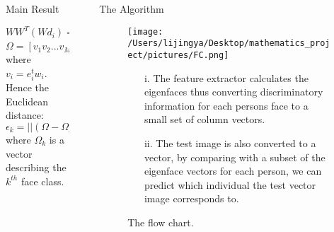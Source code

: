 \documentclass[final]{beamer}
\newlength{\sepwid}
\newlength{\onecolwid}
\newlength{\middlecolwid}
\begin{document}
\begin{frame}[t]
\begin{columns}[t]
\begin{column}{\middlecolwid}
\begin{alertblock}{Main Result}
\end{alertblock}

\vspace{-5mm}

\begin{block}

 
\begin{equation*}
WW^T(Wd_i) =\mu_i(Wd_i)
\end{equation*}
\begin{equation*}
\Omega = [v_1v_2...v_{M'}]^T
\end{equation*}
where $v_i=e_i^tw_i$. Hence the Euclidean distance:\\
\begin{equation*}
\epsilon_k = ||(\Omega - \Omega_k)||
\end{equation*}
where $\Omega_k$ is a vector describing the $k^{th}$ face class.
\end{block}
\end{column} %


\begin{column}{\sepwid}\end{column} %

\begin{column}{\onecolwid} %




\begin{block}{The Algorithm}
\begin{figure}[h]
\centering
\texttt{[image: /Users/lijingya/Desktop/mathematics\_project/pictures/FC.png]}
\caption{ The flow chart.}
\begin{itemize}
\item[i.] The feature extractor calculates the eigenfaces thus converting discriminatory information for each persons face to a small set of column vectors. 
\item[ii.] The test image is also converted to a vector, by comparing with a subset of the eigenface vectors for each person, we can predict which individual the test vector image corresponds to.


\end{itemize}
\end{figure}
\end{block}
\end{column}
\end{columns}
\end{frame}
\end{document}
